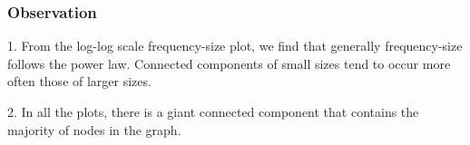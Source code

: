 \subsubsection{Observation}
1. From the log-log scale frequency-size plot, we find that generally frequency-size follows the power law. Connected components of small sizes tend to occur more often those of larger sizes.

2. In all the plots, there is a giant connected component that contains the majority of nodes in the graph. 




